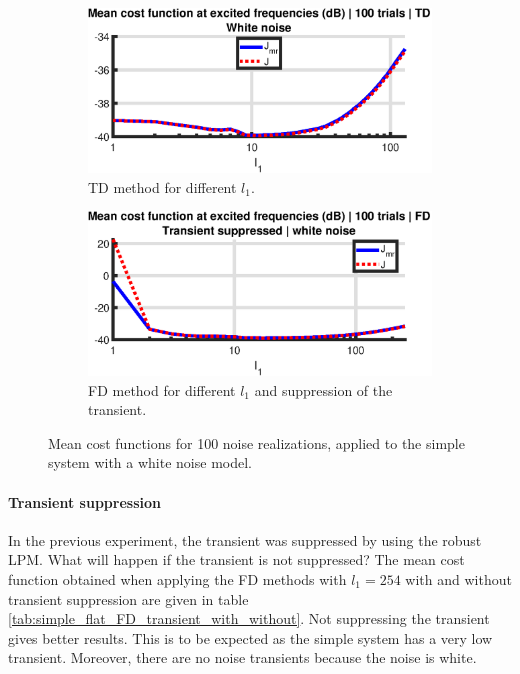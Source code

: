\begin{figure}[H]
\centering
\begin{subfigure}{0.6\textwidth}
	\includegraphics[width=\linewidth]{figures/mean_cost_function_TD_simple_flat.eps}
	\caption{TD method for different $l_1$.}
\end{subfigure}

\begin{subfigure}{0.6\textwidth}
	\includegraphics[width=\linewidth]{figures/mean_cost_function_FD_simple_flat.eps}
	\caption{FD method for different $l_1$ and suppression of the transient.}
\end{subfigure}
\caption{Mean cost functions for 100 noise realizations, applied to the simple system with a white noise model.}
\label{fig:mean_cost_function_simple_flat}
\end{figure}

\paragraph{Transient suppression}
In the previous experiment, the transient was suppressed by using the robust LPM. What will happen if the transient is not suppressed? The mean cost function obtained when applying the FD methods with $l_1=254$ with and without transient suppression are given in table \ref{tab:simple_flat_FD_transient_with_without}. Not suppressing the transient gives better results. This is to be expected as the simple system has a very low transient. Moreover, there are no noise transients because the noise is white.
    
